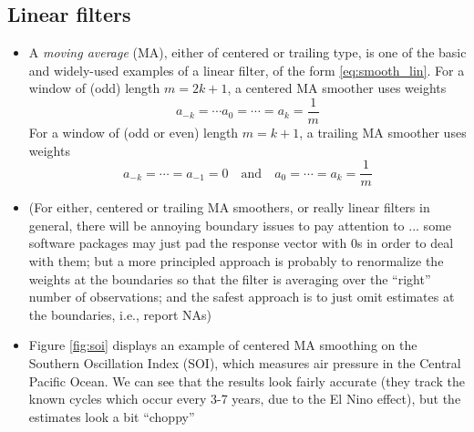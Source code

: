 \documentclass{article}
\begin{document}
\subsection{Linear filters}

\begin{itemize}
\item A \emph{moving average} (MA), either of centered or trailing type, is one
  of the basic and widely-used examples of a linear filter, of the form 
  \eqref{eq:smooth_lin}. For a window of (odd) length $m = 2k+1$, a centered MA
  smoother uses weights 
  \[
  a_{-k} = \cdots a_0 = \cdots = a_k = \frac{1}{m}
  \]
  For a window of (odd or even) length $m = k+1$, a trailing MA smoother uses
  weights 
  \[
  a_{-k} = \cdots = a_{-1} = 0 \quad \text{and} \quad 
  a_0 = \cdots = a_k = \frac{1}{m} 
  \]

\item (For either, centered or trailing MA smoothers, or really linear filters
  in general, there will be annoying boundary issues to pay attention to
  ... some software packages may just pad the response vector with 0s in order
  to deal with them; but a more principled approach is probably to renormalize
  the weights at the boundaries so that the filter is averaging over the
  ``right'' number of observations; and the safest approach is to just omit 
  estimates at the boundaries, i.e., report NAs)

\item Figure \ref{fig:soi} displays an example of centered MA smoothing on the 
  Southern Oscillation Index (SOI), which measures air pressure in the Central 
  Pacific Ocean. We can see that the results look fairly accurate (they track
  the known cycles which occur every 3-7 years, due to the El Nino effect), but
  the estimates look a bit ``choppy''    


\end{itemize}
\end{document}
